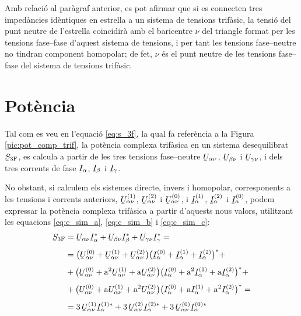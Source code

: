 Amb relaci\'{o} al par\`{a}graf anterior, es pot afirmar que si es
connecten tres imped\`{a}ncies id\`{e}ntiques en estrella a un sistema
de tensions trif\`{a}sic, la tensi\'{o} del punt neutre de l'estrella
coincidir\`{a} amb el baricentre $\nu$ del triangle format per les tensions
fase--fase d'aquest sistema de tensions, i per tant les tensions fase--neutre no tindran
component homopolar; de fet, $\nu$ \'{e}s el punt neutre de les tensions
fase--fase del sistema de tensions trif\`{a}sic.

\section{Pot\`{e}ncia} 

Tal com es veu en l'equaci\'{o} \eqref{eq:s_3f}, la qual fa refer\`{e}ncia a
la Figura \vref{pic:pot_comp_trif}, la pot\`{e}ncia complexa trif\`{a}sica
en un sistema desequilibrat $\cmplx{S}\ped{3F}$, es calcula a partir
de les tres tensions fase--neutre $\cmplx{U}_{\alpha\nu}$,
$\cmplx{U}_{\beta\nu}$ i $\cmplx{U}_{\gamma\nu}$, i dels tres
corrents de fase $\cmplx{I}_\alpha$, $\cmplx{I}_\beta$ i
$\cmplx{I}_\gamma$.


No obstant, si calculem els sistemes directe, invers i homopolar,
corresponents a les tensions i corrents anteriors,
$\cmplx{U}_{\alpha\nu}\ap{(1)}$, $\cmplx{U}_{\alpha\nu}\ap{(2)}$ i
$\cmplx{U}_{\alpha\nu}\ap{(0)}$, i $\cmplx{I}_\alpha\ap{(1)}$,
$\cmplx{I}_\alpha\ap{(2)}$ i $\cmplx{I}_\alpha\ap{(0)}$, podem
expressar la pot\`{e}ncia complexa trif\`{a}sica a partir d'aquests nous
valors, utilitzant les equacions \eqref{eq:c_sim_a},
\eqref{eq:c_sim_b} i \eqref{eq:c_sim_c}:
\begin{equation}
\begin{split}
   \cmplx{S}\ped{3F} &= \cmplx{U}_{\alpha\nu} \cmplx{I}_\alpha^* +
   \cmplx{U}_{\beta\nu} \cmplx{I}_\beta^* +  \cmplx{U}_{\gamma\nu} \cmplx{I}_\gamma^* = \\[1ex]
   &= \big(\cmplx{U}_{\alpha\nu}^{(0)} + \cmplx{U}_{\alpha\nu}^{(1)} +
   \cmplx{U}_{\alpha\nu}^{(2)}\big) \big(\cmplx{I}_\alpha^{(0)} + \cmplx{I}_\alpha^{(1)} +
   \cmplx{I}_\alpha^{(2)}\big)^* +  \\[1ex]
   &+ \big(\cmplx{U}_{\alpha\nu}^{(0)} + \au^2 \cmplx{U}_{\alpha\nu}^{(1)} +
   \au \cmplx{U}_{\alpha\nu}^{(2)} \big) \big(\cmplx{I}_\alpha^{(0)} + \au^2 \cmplx{I}_\alpha^{(1)}
    + \au \cmplx{I}_\alpha^{(2)} \big)^* + \\[1ex]
   &+ \big(\cmplx{U}_{\alpha\nu}^{(0)} + \au \cmplx{U}_{\alpha\nu}^{(1)} + \au^2
   \cmplx{U}_{\alpha\nu}^{(2)} \big) \big(\cmplx{I}_\alpha^{(0)} + \au
   \cmplx{I}_\alpha^{(1)} + \au^2 \cmplx{I}_\alpha^{(2)} \big)^* =  \\[1ex]
   &= 3\, \cmplx{U}_{\alpha\nu}^{(1)}  \cmplx{I}_\alpha^{(1)*} +
   3\, \cmplx{U}_{\alpha\nu}^{(2)}  \cmplx{I}_\alpha^{(2)*} +
   3\, \cmplx{U}_{\alpha\nu}^{(0)}  \cmplx{I}_\alpha^{(0)*} \label{eq:c_sim_s}
\end{split}
\end{equation}

